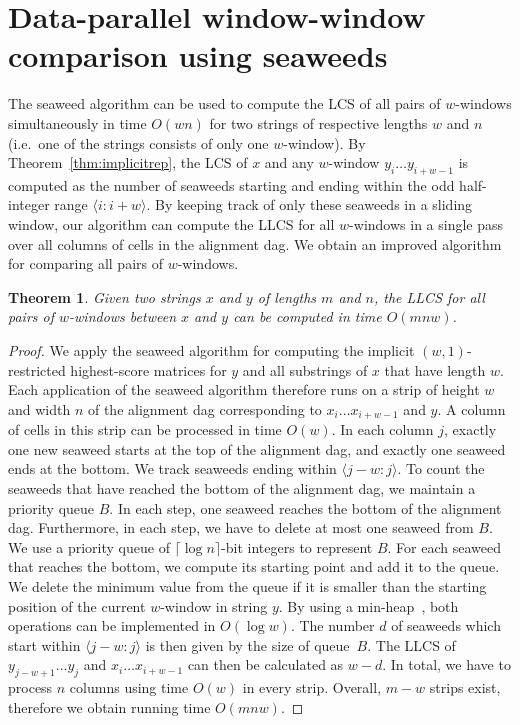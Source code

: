 \documentclass{IOS-Book-Article}     \usepackage{amsmath}
\theoremstyle{plain}
\newtheorem{theorem}{Theorem}[section]
\theoremstyle{definition}
\begin{document}
\section{Data-parallel window-window comparison using
seaweeds}\label{sec:seawinwin} 
The seaweed algorithm can be used to compute the LCS
of all pairs of $w$-windows simultaneously in time $O(wn)$ for two strings of
respective lengths $w$ and $n$ (i.e.\ one of the strings consists of only one
$w$-window). By Theorem~\ref{thm:implicitrep}, the LCS of $x$ and any
$w$-window $y_i \ldots y_{i+w-1}$ is computed as the number of seaweeds starting
and ending within the odd half-integer range $\langle i:i+w \rangle$. 
By keeping track of only these seaweeds in a sliding window,
our algorithm can compute the LLCS for all $w$-windows in a single pass over all columns of cells in the
alignment dag.
We obtain an improved algorithm for comparing all pairs of
$w$-windows.
\begin{theorem} \label{thm:basic_wlcs}
Given two strings $x$ and $y$ of lengths $m$ and $n$, the LLCS
for all pairs of $w$-windows between $x$ and $y$ can be computed in time
$O(mnw)$.
\end{theorem}
\begin{proof}
We apply the seaweed algorithm for computing the implicit $(w,1)$-restricted
highest-score matrices for $y$ and all substrings of $x$ that have length $w$.
Each application of the seaweed algorithm therefore runs on a
strip of height $w$ and width $n$ of the alignment dag corresponding to $x_i \ldots x_{i+w-1}$
and  $y$. A column of cells in this strip can be processed in time $O(w)$. 
In each column $j$, exactly one new seaweed starts at the top
of the alignment dag, and exactly one seaweed ends at the bottom.
We track seaweeds ending within $\langle j-w:j\rangle$. 
To count the seaweeds that have reached
the bottom of the alignment dag, we maintain a priority queue ${B}$. In each
step, one seaweed reaches the bottom of the alignment dag. 
Furthermore, in each step, we have to delete at most one seaweed from $B$. We
use a priority queue of $\lceil\log n\rceil$-bit integers to represent $B$.
For each seaweed that reaches the bottom, we compute its
starting point and add it to the queue. We delete the minimum
value from the queue if it is smaller than the starting position of the
current $w$-window in string $y$. By using a min-heap~\cite{Cormen+01}, both
operations can be implemented in $O(\log w)$. The number $d$ of
seaweeds which start within $\langle j-w:j\rangle$ is then given by the size of
queue~$B$. The LLCS of $y_{j-w+1}\ldots y_j$ and
$x_i\ldots x_{i+w-1}$ can then be calculated as $w-d$. In total, we have to
process $n$ columns using time $O(w)$ in every strip. Overall, $m-w$ strips
exist, therefore we obtain running time $O(m n w)$.
\end{proof}
\end{document}
